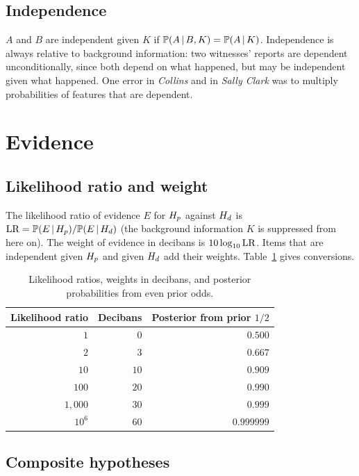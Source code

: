 \subsection{Independence}

$A$ and $B$ are independent given $K$ if $\mathbb{P}(A\,\vert\, B, K) = \mathbb{P}(A\,\vert\, K)$. Independence is always relative to background information: two witnesses' reports are dependent unconditionally, since both depend on what happened, but may be independent given what happened. One error in \emph{Collins} and in \emph{Sally Clark} was to multiply probabilities of features that are dependent.

\section{Evidence}

\subsection{Likelihood ratio and weight}

The likelihood ratio of evidence $E$ for $H_{p}$ against $H_{d}$ is $\mathrm{LR} = \mathbb{P}(E\,\vert\,H_{p})/\mathbb{P}(E\,\vert\,H_{d})$ (the background information $K$ is suppressed from here on). The weight of evidence in decibans is $10\log_{10}\mathrm{LR}$. Items that are independent given $H_{p}$ and given $H_{d}$ add their weights. Table~\ref{tab:decibans} gives conversions.

\begin{table}[ht]
\centering\small
\begin{tabular}{rrr}
\toprule
Likelihood ratio & Decibans & Posterior from prior $1/2$\\
\midrule
$1$ & $0$ & $0.500$\\
$2$ & $3$ & $0.667$\\
$10$ & $10$ & $0.909$\\
$100$ & $20$ & $0.990$\\
$1{,}000$ & $30$ & $0.999$\\
$10^{6}$ & $60$ & $0.999999$\\
\bottomrule
\end{tabular}
\caption{Likelihood ratios, weights in decibans, and posterior probabilities from even prior odds.}
\label{tab:decibans}
\end{table}

\subsection{Composite hypotheses}

